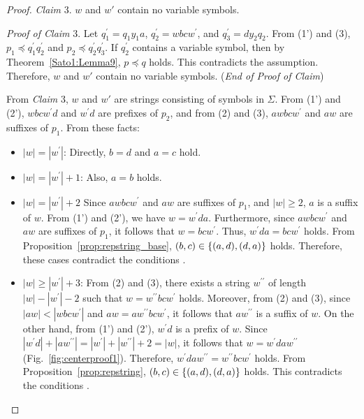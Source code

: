 \begin{proof}
  \smallskip

  \noindent
  \textit{Claim} 3. $w$ and $w'$ contain no variable symbols.

  \smallskip
  \noindent
  \textit{Proof of Claim} 3.
  Let $q_{1}^{\prime} = q_{1}y_{1}a$, $q_{2}^{\prime} = wbcw^{\prime}$, and $q_{3}^{\prime} = dy_{2}q_{2}$.
  From (1') and (3), $p_{1} \preceq q^{\prime}_{1}q^{\prime}_{2}$ and $p_{2} \preceq q^{\prime}_{2}q^{\prime}_{3}$.
  If $q_{2}^{\prime}$ contains a variable symbol, then by Theorem~\ref{Sato1:Lemma9}, $p \preceq q$ holds.
  This contradicts the assumption.
  Therefore, $w$ and $w'$ contain no variable symbols.
  (\textit{End of Proof of Claim})

  \smallskip

  From \textit{Claim} 3, $w$ and $w'$ are strings consisting of symbols in $\Sigma$.
  From (1') and (2'), $wbcw^{\prime}d$ and $w^{\prime}d$ are prefixes of $p_{2}$, and from (2) and (3), $awbcw^{\prime}$ and $aw$ are suffixes of $p_{1}$.
  From these facts:
\begin{itemize}
  \item $|w|=|w^{\prime}|$: Directly, $b = d$ and $a = c$ hold.
  \item $|w|=|w^{\prime}|+1$: Also, $a = b$ holds.
  \item $|w| = |w^{\prime}|+2$ Since $awbcw^{\prime}$ and $aw$ are suffixes of $p_{1}$, and $|w|\geq 2$, $a$ is a suffix of $w$.
  From (1') and (2'), we have $w=w^{\prime}da$.
  Furthermore, since $awbcw^{\prime}$ and $aw$ are suffixes of $p_{1}$, it follows that $w=bcw^{\prime}$.
  Thus, $w^{\prime}da = bcw^{\prime}$ holds.
  From Proposition~\ref{prop:repstring_base}, $(b,c) \in \{(a,d), (d,a)\}$ holds.
  Therefore, these cases contradict the conditions \TheConditionA.
  \item $|w| \ge |w^{\prime}|+3$: From (2) and (3), there exists a string $w^{\prime\prime}$ of length $|w|-|w^{\prime}|-2$ such that $w=w^{\prime\prime}bcw^{\prime}$ holds.
  Moreover, from (2) and (3), since $|aw| < |wbcw^{\prime}|$ and $aw = aw^{\prime\prime}bcw^{\prime}$, it follows that $aw^{\prime\prime}$ is a suffix of $w$.
  On the other hand, from (1') and (2'), $w^{\prime}d$ is a prefix of $w$.
  Since $|w^{\prime}d| + |aw^{\prime\prime}| = |w^{\prime}| + |w^{\prime\prime}| + 2 = |w|$, it follows that $w=w^{\prime}daw^{\prime\prime}$ (Fig.~\ref{fig:centerproof1}).
  Therefore, $w^{\prime}daw^{\prime\prime} = w^{\prime\prime}bcw^{\prime}$ holds.
  From Proposition~\ref{prop:repstring}, $(b,c) \in \{(a,d), (d,a)\}$ holds.
  This contradicts the conditions \TheConditionA.
\end{itemize}


\end{proof}

